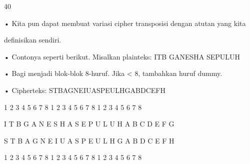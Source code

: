 \documentclass{article}
\begin{document}

40

• Kita pun dapat membuat variasi cipher transposisi dengan atutan yang kita 

definisikan sendiri.

• Contonya seperti berikut. Misalkan plainteks: ITB GANESHA SEPULUH 

• Bagi menjadi blok-blok 8-huruf. Jika < 8, tambahkan huruf dummy.

• Cipherteks: STBAGNEIUASPEULHGABDCEFH 

1 2 3 4 5 6 7 8 1 2 3 4 5 6 7 8 1 2 3 4 5 6 7 8 

I T B G A N E S H A S E P U L U H A B C D E F G 





S T B A G N E I U A S P E U L H G A B D C E F H 

1 2 3 4 5 6 7 8 1 2 3 4 5 6 7 8 1 2 3 4 5 6 7 8
\end{document}
